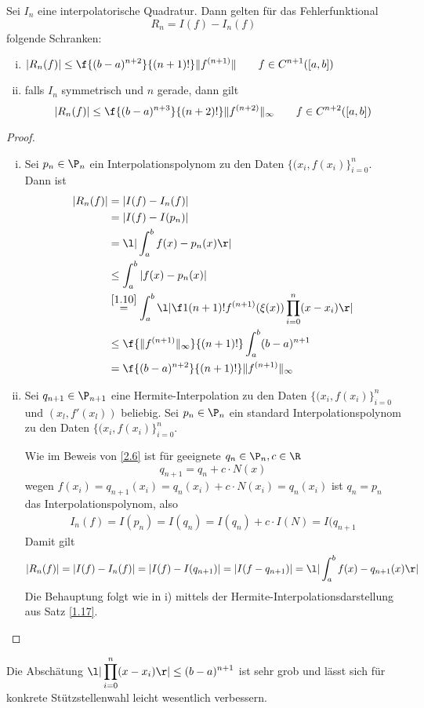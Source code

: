 \documentclass[11pt]{scrartcl}
\begin{document}
\begin{st}
	\label{2.7}
	Sei $I_n$ eine interpolatorische Quadratur.
	Dann gelten für das Fehlerfunktional
	\[
		R_n = I(f) - I_n(f)
	\]
	folgende Schranken:
	\begin{enumerate}[i)]
		\item
			$\displaystyle |R_n(f)| \le \f {(b-a)^{n+2}}{(n+1)!}\|f^{(n+1)}\| \qquad f\in C^{n+1}([a,b])$
		\item
			falls $I_n$ symmetrisch und $n$ gerade, dann gilt
			\[
				|R_n(f)| \le \f {(b-a)^{n+3}}{(n+2)!} \|f^{(n+2)}\|_\infty \qquad f\in C^{n+2}([a,b])
			\]
	\end{enumerate}
	\begin{proof}
		\begin{enumerate}[i)]
			\item
				Sei $p_n\in \P_n$ ein Interpolationspolynom zu den Daten $\{(x_i,f(x_i)\}_{i=0}^n$.
				Dann ist
				\begin{align*}
					|R_n(f)| 
					&= |I(f) - I_n(f)| \\
					&= |I(f) - I(p_n)| \\
					&= \l|\int_a^b f(x) - p_n(x) \r| \\
					&\le \int_a^b |f(x)-p_n(x)| \\
					&\stackrel{\ref{1.10}}= \int_a^b \l| \f 1{(n+1)!}f^{(n+1)}(\xi(x)) \prod_{i=0}^n (x-x_i)\r| \\
					&\le \f {\|f^{(n+1)}\|_\infty}{(n+1)!} \int_a^b (b-a)^{n+1} \\
					&= \f {(b-a)^{n+2}}{(n+1)!}\|f^{(n+1)}\|_\infty
				\end{align*}
			\item
				Sei $q_{n+1}\in \P_{n+1}$ eine Hermite-Interpolation zu den Daten $\{(x_i,f(x_i)\}_{i=0}^n$ und $(x_l,f'(x_l))$ beliebig.
				Sei $p_n\in \P_n$ ein standard Interpolationspolynom zu den Daten $\{(x_i,f(x_i)\}_{i=0}^n$.

				Wie im Beweis von \ref{2.6}	ist für geeignete $q_n\in \P_n, c\in \R$ 
				\[
					q_{n+1} = q_n + c\cdot N(x)
				\]
				wegen $f(x_i) = q_{n+1}(x_i) = q_n(x_i) + c\cdot N(x_i) = q_n(x_i)$ ist $q_n = p_n$ das Interpolationspolynom, also
				\begin{align*}
					I_n(f)
					= I(p_n)
					= I(q_n)
					= I(q_n) + c\cdot I(N)
					= I(q_{n+1}
				\end{align*}
				Damit gilt
				\[
					|R_n(f)| 
					= |I(f) - I_n(f)| 
					= |I(f) - I(q_{n+1})|
					= |I(f-q_{n+1})|
					= \l| \int_a^b f(x) - q_{n+1}(x) \r|
				\]
				Die Behauptung folgt wie in i) mittels der Hermite-Interpolationsdarstellung aus Satz \ref{1.17}.
		\end{enumerate}
	\end{proof}
	\begin{note}
		Die Abschätung $\displaystyle \l| \prod_{i=0}^n (x-x_i) \r| \le (b-a)^{n+1}$ ist sehr grob und lässt sich für konkrete Stützstellenwahl leicht wesentlich verbessern.
	\end{note}
\end{st}
\end{document}
